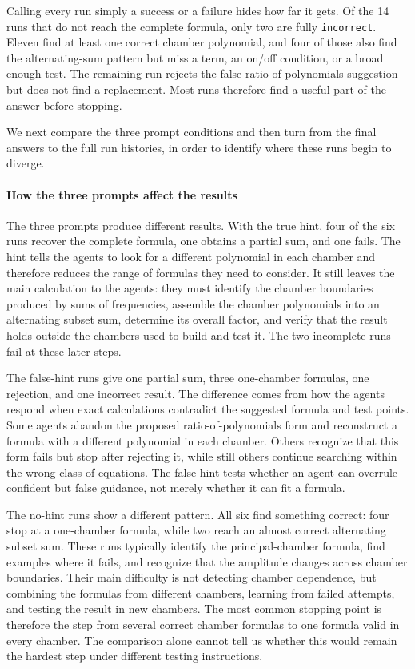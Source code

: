 \documentclass{article}
\newcommand{\outcome}[1]{\texttt{#1}}
\begin{document}
Calling every run simply a success or a failure hides how far it gets. Of the
14 runs that do not reach the complete formula, only two are fully
\outcome{incorrect}. Eleven find at least one correct chamber polynomial, and
four of those also find the alternating-sum pattern but miss a term, an on/off
condition, or a broad enough test. The remaining run rejects the false
ratio-of-polynomials suggestion but does not find a replacement. Most runs
therefore find a useful part of the answer before stopping.

We next compare the three prompt conditions and then turn from the final
answers to the full run histories, in order to identify where these
runs begin to diverge.

\paragraph{How the three prompts affect the results}

The three prompts produce different results. With the true hint, four of the six runs recover the complete
formula, one obtains a partial sum, and one fails. The hint tells the agents to
look for a different polynomial in each chamber and therefore reduces the
range of formulas they need to consider. It still leaves the main calculation
to the agents: they must identify
the chamber boundaries produced by sums of frequencies, assemble the chamber polynomials into an
alternating subset sum, determine its overall factor, and verify that
the result holds outside the chambers used to build and test it.
The two incomplete runs fail at these later steps.

The false-hint runs give one partial sum, three one-chamber formulas, one
rejection, and one incorrect result. The difference comes from how the agents
respond when exact calculations contradict the suggested formula and test
points. Some agents abandon the
proposed ratio-of-polynomials form and reconstruct a formula with a different
polynomial in each chamber. Others recognize that this form fails but stop after rejecting it,
while still others continue searching within the wrong class of equations.
The false hint tests whether an agent can overrule confident but false
guidance, not merely whether it can fit a formula.

The no-hint runs show a different pattern. All six find something correct:
four stop at a one-chamber formula, while two reach an
almost correct alternating subset sum. These runs typically identify the principal-chamber formula,
find examples where it fails, and recognize that the amplitude changes across
chamber boundaries. Their main difficulty is not detecting chamber dependence, but
combining the formulas from different chambers, learning from failed attempts,
and testing the result in new chambers. The most common stopping point is
therefore the step from several correct chamber formulas to one formula valid
in every chamber. The comparison alone cannot tell us whether this would
remain the hardest step under different testing instructions.
\end{document}
